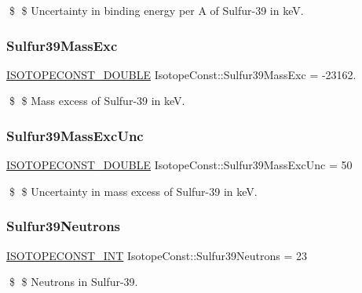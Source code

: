 \$ \$ Uncertainty in binding energy per A of Sulfur-\/39 in keV. \mbox{\label{group___isotope_const-_sulfur-_s39_gab747d558c0f3d965ea9f9f13db1b1a91}} 
\subsubsection{\texorpdfstring{Sulfur39\+Mass\+Exc}{Sulfur39MassExc}}
{\footnotesize\ttfamily \mbox{\hyperlink{group___isotope_const-_macros_ga8f45a7272ce02c0b4c65c44636ed719a}{I\+S\+O\+T\+O\+P\+E\+C\+O\+N\+S\+T\+\_\+\+D\+O\+U\+B\+LE}} Isotope\+Const\+::\+Sulfur39\+Mass\+Exc = -\/23162.}

\$ \$ Mass excess of Sulfur-\/39 in keV. \mbox{\label{group___isotope_const-_sulfur-_s39_ga0bf32523eb3b49ced4aa54d27b09fbc9}} 
\subsubsection{\texorpdfstring{Sulfur39\+Mass\+Exc\+Unc}{Sulfur39MassExcUnc}}
{\footnotesize\ttfamily \mbox{\hyperlink{group___isotope_const-_macros_ga8f45a7272ce02c0b4c65c44636ed719a}{I\+S\+O\+T\+O\+P\+E\+C\+O\+N\+S\+T\+\_\+\+D\+O\+U\+B\+LE}} Isotope\+Const\+::\+Sulfur39\+Mass\+Exc\+Unc = 50}

\$ \$ Uncertainty in mass excess of Sulfur-\/39 in keV. \mbox{\label{group___isotope_const-_sulfur-_s39_ga07813f548708b2eb423805b65ae85a2b}} 
\subsubsection{\texorpdfstring{Sulfur39\+Neutrons}{Sulfur39Neutrons}}
{\footnotesize\ttfamily \mbox{\hyperlink{group___isotope_const-_macros_ga5f18360b3e99483a35c32d789e62621c}{I\+S\+O\+T\+O\+P\+E\+C\+O\+N\+S\+T\+\_\+\+I\+NT}} Isotope\+Const\+::\+Sulfur39\+Neutrons = 23}

\$ \$ Neutrons in Sulfur-\/39. \mbox{\label{group___isotope_const-_sulfur-_s39_ga89adfbc68c4e1c7e1a9392c6270db8e5}} 
